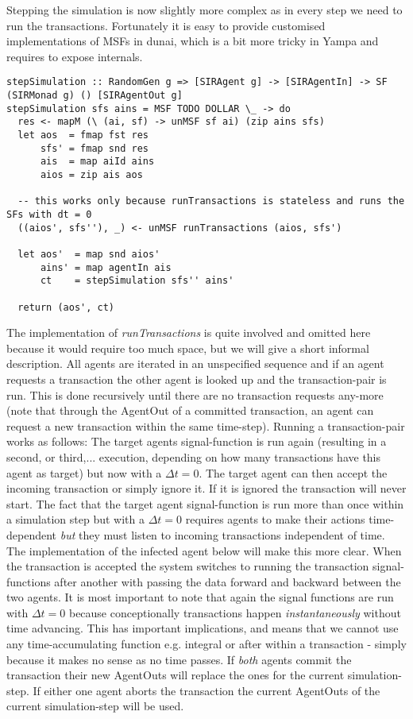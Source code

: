 Stepping the simulation is now slightly more complex as in every step we need to run the transactions. Fortunately it is easy to provide customised implementations of MSFs in dunai, which is a bit more tricky in Yampa and requires to expose internals.

\begin{verbatim}
stepSimulation :: RandomGen g => [SIRAgent g] -> [SIRAgentIn] -> SF (SIRMonad g) () [SIRAgentOut g]
stepSimulation sfs ains = MSF TODO DOLLAR \_ -> do
  res <- mapM (\ (ai, sf) -> unMSF sf ai) (zip ains sfs)
  let aos  = fmap fst res
      sfs' = fmap snd res
      ais  = map aiId ains
      aios = zip ais aos

  -- this works only because runTransactions is stateless and runs the SFs with dt = 0
  ((aios', sfs''), _) <- unMSF runTransactions (aios, sfs')

  let aos'  = map snd aios'
      ains' = map agentIn ais
      ct    = stepSimulation sfs'' ains'
      
  return (aos', ct)
\end{verbatim}

The implementation of \textit{runTransactions} is quite involved and omitted here because it would require too much space, but we will give a short informal description. All agents are iterated in an unspecified sequence and if an agent requests a transaction the other agent is looked up and the transaction-pair is run. This is done recursively until there are no transaction requests any-more (note that through the AgentOut of a committed transaction, an agent can request a new transaction within the same time-step). Running a transaction-pair works as follows:
The target agents signal-function is run again (resulting in a second, or third,... execution, depending on how many transactions have this agent as target) but now with a $\Delta t = 0$. The target agent can then accept the incoming transaction or simply ignore it. If it is ignored the transaction will never start. The fact that the target agent signal-function is run more than once within a simulation step but with a $\Delta t = 0$ requires agents to make their actions time-dependent \textit{but} they must listen to incoming transactions independent of time. The implementation of the infected agent below will make this more clear.
When the transaction is accepted the system switches to running the transaction signal-functions after another with passing the data forward and backward between the two agents. It is most important to note that again the signal functions are run with $\Delta t = 0$ because conceptionally transactions happen \textit{instantaneously} without time advancing. This has important implications, and means that we cannot use any time-accumulating function e.g. integral or after within a transaction - simply because it makes no sense as no time passes. If \textit{both} agents commit the transaction their new AgentOuts will replace the ones for the current simulation-step. If either one agent aborts the transaction the current AgentOuts of the current simulation-step will be used.

